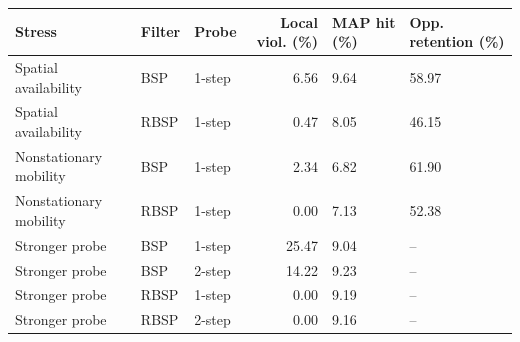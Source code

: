 \begin{tabular}{lllrll}
\toprule
Stress & Filter & Probe & Local viol. (\%) & MAP hit (\%) & Opp. retention (\%) \\
\midrule
Spatial availability & BSP & 1-step & 6.56 & 9.64 & 58.97 \\
Spatial availability & RBSP & 1-step & 0.47 & 8.05 & 46.15 \\
Nonstationary mobility & BSP & 1-step & 2.34 & 6.82 & 61.90 \\
Nonstationary mobility & RBSP & 1-step & 0.00 & 7.13 & 52.38 \\
Stronger probe & BSP & 1-step & 25.47 & 9.04 & -- \\
Stronger probe & BSP & 2-step & 14.22 & 9.23 & -- \\
Stronger probe & RBSP & 1-step & 0.00 & 9.19 & -- \\
Stronger probe & RBSP & 2-step & 0.00 & 9.16 & -- \\
\bottomrule
\end{tabular}
